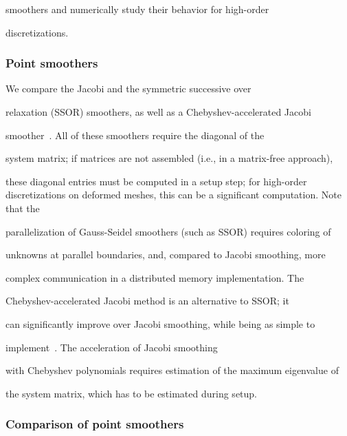 \documentclass[smallcondensed,final]{svjour3}     %
\begin{document}
smoothers and numerically study their behavior for high-order

discretizations.



\subsubsection{Point smoothers}


We compare the Jacobi and the symmetric successive over

relaxation (SSOR) smoothers, as well as a Chebyshev-accelerated Jacobi

smoother~\cite{Brandt77}. All of these smoothers require the diagonal of the

system matrix; if matrices are not assembled (i.e., in a matrix-free approach),

these diagonal entries must be computed in a setup step; for high-order discretizations on deformed meshes, this can be a significant computation.  Note that the

parallelization of Gauss-Seidel smoothers (such as SSOR) requires coloring of

unknowns at parallel boundaries, and, compared to Jacobi smoothing, more

complex communication in a distributed memory implementation. The

Chebyshev-accelerated Jacobi method is an alternative to SSOR; it

can significantly improve over Jacobi smoothing, while being as simple to

implement~\cite{AdamsBrezinaHuEtAl03}. The acceleration of Jacobi smoothing

with Chebyshev polynomials requires estimation of the maximum eigenvalue of

the system matrix, which has to be estimated during setup.





\subsubsection{Comparison of point smoothers}\label{subsubsec:ptsmoothcomparison}
\end{document}
